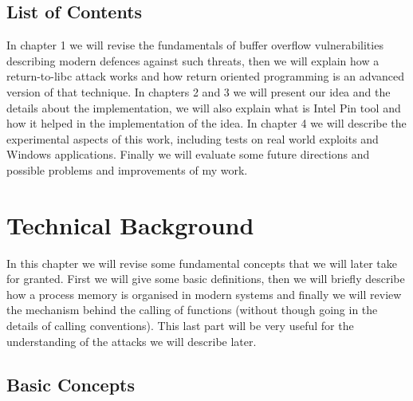 \documentclass[Lau,binding=0.6cm]{sapthesis}
\begin{document}
\section*{List of Contents}
In chapter 1 we will revise the fundamentals of buffer overflow vulnerabilities describing modern defences against such threats, then we will explain how a return-to-libc attack works and how return oriented programming is an advanced version of that technique. In chapters 2 and 3 we will present our idea and the details about the implementation, we will also explain what is Intel Pin tool and how it helped in the implementation of the idea. In chapter 4 we will describe the experimental aspects of this work, including tests on real world exploits and Windows applications. Finally we will evaluate some future directions and possible problems and improvements of my work.

\mainmatter

\chapter{Technical Background}

In this chapter we will revise some fundamental concepts that we will later take for granted. First we will give some basic definitions, then we will briefly describe how a process memory is organised in modern systems and finally we will review the mechanism behind the calling of functions (without though going in the details of calling conventions). This last part will be very useful for the understanding of the attacks we will describe later.

\section{Basic Concepts}
\end{document}
